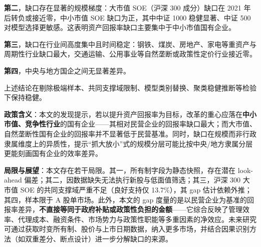 \documentclass[11pt,a4paper]{ctexart}
\begin{document}
\textbf{第二}，缺口存在显著的规模梯度：大市值 SOE（沪深 300 成分）缺口在 2021 年后转负或接近零，中小市值 SOE 缺口为正，其中中证 1000 稳健显著、中证 500 对模型选择更敏感。这表明资产回报率缺口主要集中于中小市值国有企业。

\textbf{第三}，缺口在行业间高度集中且时间稳定：钢铁、煤炭、房地产、家电等重资产与周期性行业缺口最大，交通运输、公用事业等自然垄断或政策性定价行业接近零。

\textbf{第四}，中央与地方国企之间无显著差异。

上述结论在剔除极端样本、共同支撑域限制、模型类别替换、聚类稳健推断等检验下保持稳健。

\textbf{政策含义}：本文的发现提示，若以提升资产回报率为目标，改革的重心应落在\textbf{中小市值、竞争性行业}的国有企业——其相对民营企业的回报率缺口最大；而大市值、自然垄断性国有企业的回报率并不显著低于民营基准。同时，缺口在规模而非行政隶属维度上的异质性，提示“抓大放小”式的规模分层可能比按中央/地方隶属分层更能刻画国有企业的效率差异。

\textbf{局限与展望}：本文存在若干局限。其一，所有制字段为静态快照，存在潜在 look-ahead 偏差；其二，因数据缺失无法执行新股与低面值筛选；其三，沪深 300 大市值 SOE 的共同支撑域严重不足（良好支持仅 13.7\%），其 gap 估计依赖外推；其四，样本限于 A 股单市场。此外，本文的 gap 度量的是以民营企业为基准的回报率差异，\textbf{不直接等同于政府补贴或政策性负担的金额}——它综合反映了管理效率、代理成本、融资条件、市场势力与政策性职能等多重因素的净效应。未来研究可通过获取时变所有制、股价与上市日期数据，纳入更多市场，并结合因果识别方法（如双重差分、断点设计）进一步分解缺口的来源。
\end{document}
